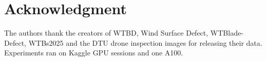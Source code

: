 \section*{Acknowledgment}
The authors thank the creators of WTBD, Wind Surface Defect, WTBlade-Defect, WTBs2025 and the DTU drone inspection images for releasing their data. Experiments ran on Kaggle GPU sessions and one A100.
